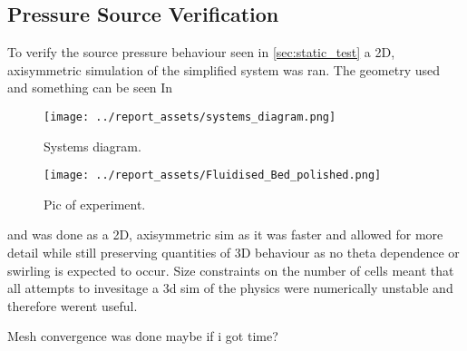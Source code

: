\subsection{Pressure Source Verification}
To verify the source pressure behaviour seen in \autoref{sec:static_test} a 2D, axisymmetric simulation of the simplified system was ran. The geometry used and something can be seen In
\begin{figure}[htbp]
    \centering

    \begin{minipage}{0.45\textwidth}
        \centering
        \texttt{[image: ../report\_assets/systems\_diagram.png]}
        \caption{Systems diagram.}\label{fig:geometry_static_sim}
    \end{minipage}
    \hfill
    \begin{minipage}{0.45\textwidth}
        \centering
        \texttt{[image: ../report\_assets/Fluidised\_Bed\_polished.png]}
        \caption{Pic of experiment.}\label{fig:something_else}
    \end{minipage}

\end{figure}
and was done as a 2D, axisymmetric sim as it was faster and allowed for more detail while still preserving quantities of 3D behaviour as no theta dependence or swirling is expected to occur. Size constraints on the number of cells meant that all attempts to invesitage a 3d sim of the physics were numerically unstable and therefore werent useful.

Mesh convergence was done maybe if i got time?

